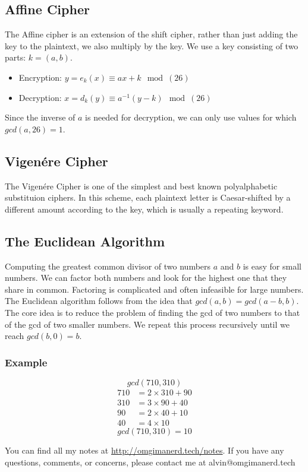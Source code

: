 \documentclass{math}
\begin{document}
\subsection*{Affine Cipher}
The Affine cipher is an extension of the shift cipher, rather than just adding
the key to the plaintext, we also multiply by the key. We use a key consisting
of two parts: \( k = (a,b) \).
\begin{itemize}
  \item Encryption: \( y = e_k(x) \equiv ax+k\mod(26) \)
  \item Decryption: \( x = d_k(y) \equiv a^{-1}(y-k)\mod(26) \)
\end{itemize}
Since the inverse of \( a \) is needed for decryption, we can only use values
for which \( gcd(a,26) = 1 \).

\subsection*{Vigen\'{e}re Cipher}
The Vigen\'{e}re Cipher is one of the simplest and best known polyalphabetic
substituion ciphers. In this scheme, each plaintext letter is Caesar-shifted
by a different amount according to the key, which is usually a repeating
keyword.

\subsection*{The Euclidean Algorithm}
Computing the greatest common divisor of two numbers \( a \) and \( b \) is
easy for small numbers. We can factor both numbers and look for the highest one
that they share in common. Factoring is complicated and often infeasible for
large numbers. The Euclidean algorithm follows from the idea that \( gcd(a,b) =
gcd(a-b,b) \). The core idea is to reduce the problem of finding the gcd of
two numbers to that of the gcd of two smaller numbers. We repeat this process
recursively until we reach \( gcd(b,0) = b \).

\subsubsection*{Example}
\[ gcd(710,310) \]
\begin{align*}
  710 &= 2\times310+90 \\
  310 &= 3\times90+40 \\
  90 &= 2\times40+10 \\
  40 &= 4\times10
\end{align*}
\[ gcd(710,310) = 10 \]

\begin{center}
  You can find all my notes at \url{http://omgimanerd.tech/notes}. If you have
  any questions, comments, or concerns, please contact me at
  alvin@omgimanerd.tech
\end{center}
\end{document}
